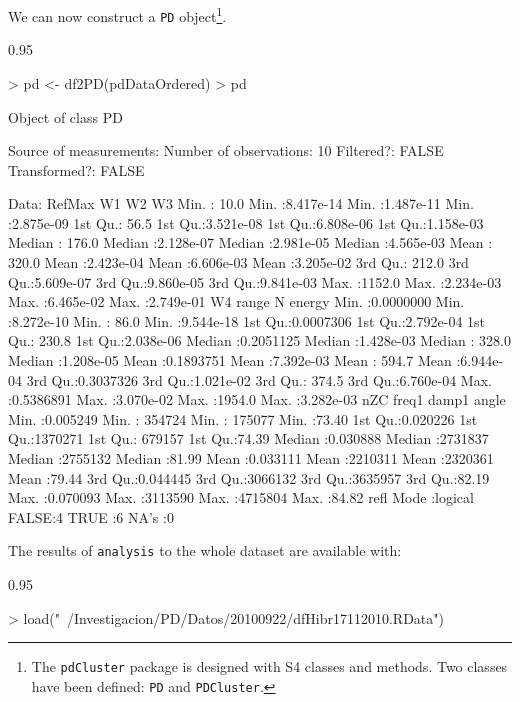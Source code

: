 \documentclass{article}
\renewenvironment{Schunk}{\begin{center}
    \scriptsize
    \begin{boxedminipage}{0.95\textwidth}}{
    \end{boxedminipage}\end{center}}
\begin{document}
We can now construct a \texttt{PD} object\footnote{The
  \texttt{pdCluster} package is designed with S4 classes and
  methods. Two classes have been defined: \texttt{PD} and \texttt{PDCluster}.}.
\begin{Schunk}
\begin{Sinput}
> pd <- df2PD(pdDataOrdered)
> pd
\end{Sinput}
\begin{Soutput}
Object of class  PD 

Source of measurements:  
Number of observations:  10 
Filtered?:  FALSE 
Transformed?: FALSE 

Data:
     RefMax             W1                  W2                  W3           
 Min.   :  10.0   Min.   :8.417e-14   Min.   :1.487e-11   Min.   :2.875e-09  
 1st Qu.:  56.5   1st Qu.:3.521e-08   1st Qu.:6.808e-06   1st Qu.:1.158e-03  
 Median : 176.0   Median :2.128e-07   Median :2.981e-05   Median :4.565e-03  
 Mean   : 320.0   Mean   :2.423e-04   Mean   :6.606e-03   Mean   :3.205e-02  
 3rd Qu.: 212.0   3rd Qu.:5.609e-07   3rd Qu.:9.860e-05   3rd Qu.:9.841e-03  
 Max.   :1152.0   Max.   :2.234e-03   Max.   :6.465e-02   Max.   :2.749e-01  
       W4                range                 N              energy         
 Min.   :0.0000000   Min.   :8.272e-10   Min.   :  86.0   Min.   :9.544e-18  
 1st Qu.:0.0007306   1st Qu.:2.792e-04   1st Qu.: 230.8   1st Qu.:2.038e-06  
 Median :0.2051125   Median :1.428e-03   Median : 328.0   Median :1.208e-05  
 Mean   :0.1893751   Mean   :7.392e-03   Mean   : 594.7   Mean   :6.944e-04  
 3rd Qu.:0.3037326   3rd Qu.:1.021e-02   3rd Qu.: 374.5   3rd Qu.:6.760e-04  
 Max.   :0.5386891   Max.   :3.070e-02   Max.   :1954.0   Max.   :3.282e-03  
      nZC               freq1             damp1             angle      
 Min.   :0.005249   Min.   : 354724   Min.   : 175077   Min.   :73.40  
 1st Qu.:0.020226   1st Qu.:1370271   1st Qu.: 679157   1st Qu.:74.39  
 Median :0.030888   Median :2731837   Median :2755132   Median :81.99  
 Mean   :0.033111   Mean   :2210311   Mean   :2320361   Mean   :79.44  
 3rd Qu.:0.044445   3rd Qu.:3066132   3rd Qu.:3635957   3rd Qu.:82.19  
 Max.   :0.070093   Max.   :3113590   Max.   :4715804   Max.   :84.82  
    refl        
 Mode :logical  
 FALSE:4        
 TRUE :6        
 NA's :0        
\end{Soutput}
\end{Schunk}

The results of \texttt{analysis} to the whole dataset are available with:
\begin{Schunk}
\begin{Sinput}
> load("~/Investigacion/PD/Datos/20100922/dfHibr17112010.RData")
\end{Sinput}
\end{Schunk}
\end{document}
